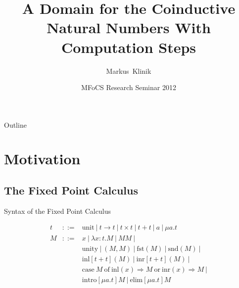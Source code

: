 \documentclass{beamer}
\title[Short Paper Title] %
{A Domain for the Coinductive Natural Numbers With Computation Steps}
\author[Klinikr] %
{Markus~Klinik}
\institute[Radboud University Nijmegen] %
{
  Radboud University Nijmegen
}
\date[2012] %
{MFoCS Research Seminar 2012}
\newcommand{\arr}{\rightarrow}
\newcommand{\Arr}{\Rightarrow}
\begin{document}
\begin{frame}
  \titlepage
\end{frame}

\begin{frame}{Outline}
  \tableofcontents
\end{frame}





\section{Motivation}

\subsection{The Fixed Point Calculus}


\begin{frame}{Syntax of the Fixed Point Calculus}

  \begin{eqnarray*}
  t & ::= & \text{unit}\ |\ t \arr t\ |\ t \times t\ |\ t + t\ |\ a\ |\ \mu a.t \\
  M & ::= & x\ |\ \lambda x : t . M \ |\ MM \ | \\
    &     & \text{unity}\ |\ (M, M)\ |\ \text{fst}(M)\ |\ \text{snd}(M)\ | \\
    &     & \text{inl}[t + t](M)\ |\ \text{inr}[t + t](M)\ | \\
    &     & \text{case}\ M\ \text{of}\ \text{inl}(x) \Arr M\ \text{or}\ \text{inr}(x) \Arr M\ | \\
    &     & \text{intro}[\mu a.t]M\ |\ \text{elim}[\mu a.t]M
  \end{eqnarray*}

\end{frame}
\end{document}
